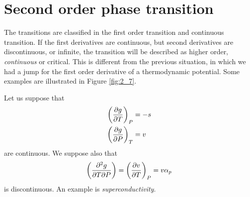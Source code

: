 \documentclass[../../Main/Main.tex]{subfiles}
\begin{document}
\clearpage

\section{Second order phase transition}
The transitions are classified in the first order transition and continuous transition.
If the first derivatives are continuous, but second derivatives are discontinuous, or infinite, the transition will be described as higher order, \emph{continuous} or critical. This is different from the previous situation, in which we had a jump for the first order derivative of a thermodynamic potential. Some examples are illustrated in Figure \ref{fig:2_7}.

Let us suppose that
\begin{subequations}
\begin{align}
  \qty(\pdv{g}{T} )_P &= -s \\
  \qty(\pdv{g}{P} )_T &= v
\end{align}
\end{subequations}
are continuous. We suppose also that
\begin{equation}
  \qty(\pdv{g}{T}{P}  ) = \qty(\pdv{v}{T} )_P = v \alpha_p
  \label{eq:}
\end{equation}
is discontinuous.
An example is \emph{superconductivity}.
\end{document}
